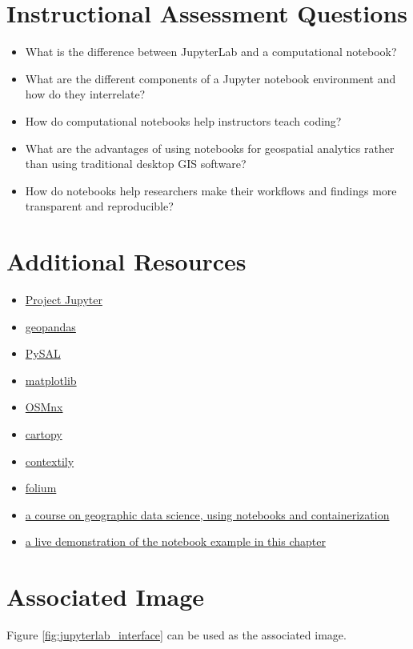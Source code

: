 \documentclass[11pt,letterpaper]{article}
\begin{document}
\section*{Instructional Assessment Questions}

\begin{itemize}
    \item What is the difference between JupyterLab and a computational notebook?
    \item What are the different components of a Jupyter notebook environment and how do they interrelate?
    \item How do computational notebooks help instructors teach coding?
    \item What are the advantages of using notebooks for geospatial analytics rather than using traditional desktop GIS software?
    \item How do notebooks help researchers make their workflows and findings more transparent and reproducible?
\end{itemize}

\section*{Additional Resources}

\begin{itemize}
    \item \href{https://jupyter.org/}{Project Jupyter}
    \item \href{https://geopandas.org/}{geopandas}
    \item \href{https://pysal.org/}{PySAL}
    \item \href{https://matplotlib.org/}{matplotlib}
    \item \href{https://osmnx.readthedocs.io/}{OSMnx}
    \item \href{https://scitools.org.uk/cartopy/docs/latest/}{cartopy}
    \item \href{https://contextily.readthedocs.io/}{contextily}
    \item \href{https://python-visualization.github.io/folium/}{folium}
    \item \href{https://darribas.org/gds_course}{a course on geographic data science, using notebooks and containerization}
    \item \href{https://github.com/darribas/bok_chapter_notebooks}{a live demonstration of the notebook example in this chapter}
\end{itemize}

\section*{Associated Image}

Figure \ref{fig:jupyterlab_interface} can be used as the associated image.
\end{document}
